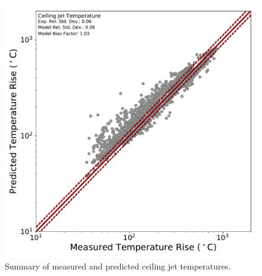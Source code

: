 \begin{figure}[!h]
	\centering
	\includegraphics[width=\columnwidth]{Figures/Plots/Validation/Temperature/loglog_cjetTCs}
	\caption{Summary of measured and predicted ceiling jet temperatures.}
	\label{fig:loglog_cjets}
\end{figure}

\clearpage
